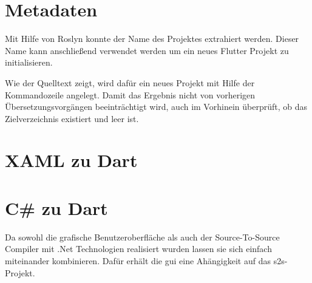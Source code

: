 \section{Metadaten}


Mit Hilfe von Roslyn konnte der Name des Projektes extrahiert werden.  Dieser Name kann anschließend verwendet werden um ein neues Flutter Projekt zu initialisieren.  

Wie der Quelltext zeigt,  wird dafür ein neues Projekt mit Hilfe der Kommandozeile angelegt.  Damit das Ergebnis nicht von vorherigen Übersetzungsvorgängen beeinträchtigt wird,  auch im Vorhinein überprüft,  ob das Zielverzeichnis existiert und leer ist. 



\section{XAML zu Dart}



\section{C\# zu Dart}


Da sowohl die grafische Benutzeroberfläche als auch der Source-To-Source Compiler mit .Net Technologien realisiert wurden lassen sie sich einfach miteinander kombinieren.  Dafür erhält die  \ac{gui} eine Ahängigkeit auf das \ac{s2s}-Projekt.  



